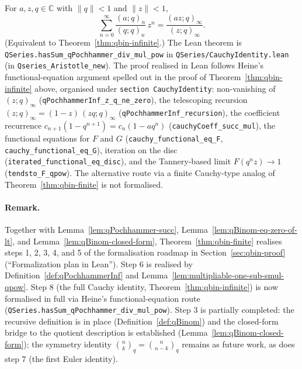 \begin{theorem}\label{thm:qbin-infinite-formalized}\leanok{}
For $a, z, q \in \mathbb{C}$ with $\|q\| < 1$ and $\|z\| < 1$,
\[
  \sum_{n=0}^{\infty} \frac{(a; q)_n}{(q; q)_n}\, z^n
    = \frac{(a z; q)_\infty}{(z; q)_\infty}.
\]
(Equivalent to Theorem~\ref{thm:qbin-infinite}.)
The Lean theorem is \texttt{QSeries.hasSum\_qPochhammer\_div\_mul\_pow} in
\texttt{QSeries/CauchyIdentity.lean} (in \texttt{Qseries\_Aristotle\_new}).
The proof realised in Lean follows Heine's
functional-equation argument spelled out in the proof of
Theorem~\ref{thm:qbin-infinite} above, organised under
\texttt{section CauchyIdentity}: non-vanishing of $(z;q)_\infty$
(\texttt{qPochhammerInf\_z\_q\_ne\_zero}), the telescoping recursion
$(z;q)_\infty = (1-z)\,(zq;q)_\infty$ (\texttt{qPochhammerInf\_recursion}),
the coefficient recurrence $c_{n+1}(1-q^{n+1}) = c_n(1 - a q^n)$
(\texttt{cauchyCoeff\_succ\_mul}), the functional equations for $F$ and $G$
(\texttt{cauchy\_functional\_eq\_F}, \texttt{cauchy\_functional\_eq\_G}),
iteration on the disc (\texttt{iterated\_functional\_eq\_disc}), and the
Tannery-based limit $F(q^n z) \to 1$ (\texttt{tendsto\_F\_qpow}). The
alternative route via a finite Cauchy-type analog of
Theorem~\ref{thm:qbin-finite} is not formalised.
\end{theorem}

\paragraph{Remark.} Together with Lemma~\ref{lem:qPochhammer-succ},
Lemma~\ref{lem:qBinom-eq-zero-of-lt}, and Lemma~\ref{lem:qBinom-closed-form},
Theorem~\ref{thm:qbin-finite} realises steps 1, 2, 3, 4, and
5 of the formalisation roadmap in Section~\ref{sec:qbin-proof}
(``Formalization plan in Lean''). Step 6 is realised by
Definition~\ref{def:qPochhammerInf} and
Lemma~\ref{lem:multipliable-one-sub-smul-qpow}. Step 8 (the full Cauchy
identity, Theorem~\ref{thm:qbin-infinite}) is now formalised in full
via Heine's functional-equation route (\texttt{QSeries.hasSum\_qPochhammer\_div\_mul\_pow}).
Step 3 is partially completed: the recursive definition is in place
(Definition~\ref{def:qBinom}) and the closed-form bridge to the quotient
description is established (Lemma~\ref{lem:qBinom-closed-form}); the
symmetry identity $\binom{n}{k}_q = \binom{n}{n-k}_q$ remains as future
work, as does step 7 (the first Euler identity).

